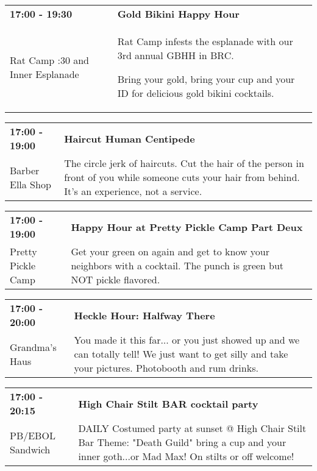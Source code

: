 \begin{tabular}{ p{1in} p{2.2in} }
    \textbf{17:00 - 19:30} & \textbf{Gold Bikini Happy Hour} \\
    Rat Camp \newline 7:30 and Inner Esplanade & Rat Camp infests the esplanade with our 3rd annual GBHH in BRC. 

Bring your gold, bring your cup and your ID for delicious gold bikini cocktails. \\
    \hline 
\end{tabular}
    
\begin{tabular}{ p{1in} p{2.2in} }
    \textbf{17:00 - 19:00} & \textbf{Haircut Human Centipede} \\
    Barber Ella Shop \newline  & The circle jerk of haircuts. Cut the hair of the person in front of you while someone cuts your hair from behind. It's an experience, not a service. \\
    \hline 
\end{tabular}
    
\begin{tabular}{ p{1in} p{2.2in} }
    \textbf{17:00 - 19:00} & \textbf{Happy Hour at Pretty Pickle Camp Part Deux} \\
    Pretty Pickle Camp \newline  & Get your green on again and get to know your neighbors with a cocktail. The punch is green but NOT pickle flavored. \\
    \hline 
\end{tabular}
    
\begin{tabular}{ p{1in} p{2.2in} }
    \textbf{17:00 - 20:00} & \textbf{Heckle Hour: Halfway There} \\
    Grandma's Haus \newline  & You made it this far... or you just showed up and we can totally tell! We just want to get silly and take your pictures. Photobooth and rum drinks. \\
    \hline 
\end{tabular}
    
\begin{tabular}{ p{1in} p{2.2in} }
    \textbf{17:00 - 20:15} & \textbf{High Chair Stilt BAR cocktail party} \\
    PB/EBOL Sandwich \newline  & DAILY Costumed party at sunset @ High Chair Stilt Bar Theme: "Death Guild" bring a cup and your inner goth...or Mad Max! On stilts or off welcome! \\
    \hline 
\end{tabular}
    
